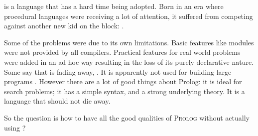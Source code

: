 \documentclass[thesis-solanki.tex]{subfiles}
\begin{document}

\begin{comment}
\progLang{Prolog} has a similar story. It was born in an era where procedural programming had made everyone notice their presence. Talking about
competition, it was against something radical; the \progLang{C} programming language. The languages \progLang{C} has influenced is off the chart and
so is the performance. It had paved the way for structured procedural programming and had given birth to the Unix operating system. Though the
original version of \progLang{Prolog} has given rise to a large number of different flavours but a few drawbacks remain through the bloodline and as a
result it did become the first choice. Some basic requirements such as modules are not provided by all compilers. To make it do real world stuff, a set of
practical features are pushed in now and then which results in the loss of the purely declarative charm. The problem is that \progLang{Prolog} is fading
away, \cite{website:prolog-steam,website:prolog-death,website:prolog-killer}, not many people use it and most of the times when it is used, the variant
is usually \textit{practical} \progLang{Prolog} and the area being academia. It is not used for building large programs \cite{wikiprolog,somogyi1995
logic,website:prolog1000db}. But there are a lot of good things about \progLang{Prolog} that should not die away. Moreover, \progLang{Prolog} is ideal
for search problems.
\end{comment}

 is a language that has a hard time being adopted.
Born in an era where procedural languages were receiving a lot of attention, it suffered from competing against another
new kid on the block: .

Some of the problems were due to its own limitations.
Basic features like modules were not provided by all compilers.
Practical features for real world problems were added in an ad hoc way resulting in the loss of its purely declarative
nature.
Some say that  is fading away, \cite{website:prolog-steam,website:prolog-death,website:prolog-killer}.
It is apparently not used for building large programs \cite{wikiprolog,somogyi1995logic,website:prolog1000db}.
However there are a lot of good things about Prolog: it is ideal for search problems; it has a simple syntax, and a
strong underlying theory.
It is a language that should not die away.

So the question is how to have all the good qualities of \textsc{Prolog} without actually using ?
\end{document}
